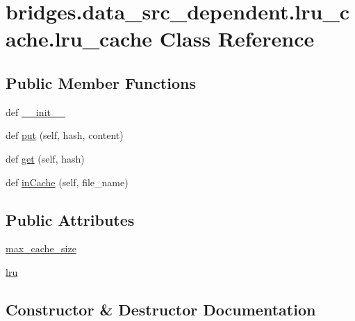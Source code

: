 \hypertarget{classbridges_1_1data__src__dependent_1_1lru__cache_1_1lru__cache}{}\section{bridges.\+data\+\_\+src\+\_\+dependent.\+lru\+\_\+cache.\+lru\+\_\+cache Class Reference}
\label{classbridges_1_1data__src__dependent_1_1lru__cache_1_1lru__cache}
\subsection*{Public Member Functions}
\begin{DoxyCompactItemize}
\item 
def \hyperlink{classbridges_1_1data__src__dependent_1_1lru__cache_1_1lru__cache_a66d09fd9beb3e82c94960960456fc6f7}{\+\_\+\+\_\+init\+\_\+\+\_\+}
\item 
def \hyperlink{classbridges_1_1data__src__dependent_1_1lru__cache_1_1lru__cache_a98b97dd34aeaec0856bbc560cbac2866}{put} (self, hash, content)
\item 
def \hyperlink{classbridges_1_1data__src__dependent_1_1lru__cache_1_1lru__cache_a808ebb43936c26cae242752509e3e772}{get} (self, hash)
\item 
def \hyperlink{classbridges_1_1data__src__dependent_1_1lru__cache_1_1lru__cache_abfd53102b85993476f3dc75416811761}{in\+Cache} (self, file\+\_\+name)
\end{DoxyCompactItemize}
\subsection*{Public Attributes}
\begin{DoxyCompactItemize}
\item 
\hyperlink{classbridges_1_1data__src__dependent_1_1lru__cache_1_1lru__cache_a87a170ed62886de32e1bbf0d9ac05cfd}{max\+\_\+cache\+\_\+size}
\item 
\hyperlink{classbridges_1_1data__src__dependent_1_1lru__cache_1_1lru__cache_a2568c6b5de855a1ad90f876276b8cf49}{lru}
\end{DoxyCompactItemize}


\subsection{Constructor \& Destructor Documentation}
\mbox{\label{classbridges_1_1data__src__dependent_1_1lru__cache_1_1lru__cache_a66d09fd9beb3e82c94960960456fc6f7}} 
